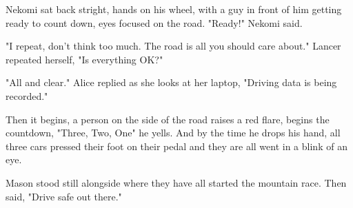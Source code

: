 Nekomi sat back stright, hands on his wheel, with a guy in front of him getting ready to count down, eyes focused on the road. "Ready!" Nekomi said.

"I repeat, don't think too much. The road is all you should care about." Lancer repeated herself, "Is everything OK?"

"All and clear." Alice replied as she looks at her laptop, "Driving data is being recorded."

Then it begins, a person on the side of the road raises a red flare, begins the countdown, "Three, Two, One" he yells. And by the time he drops his hand, all three cars pressed their foot on their pedal and they are all went in a blink of an eye.

Mason stood still alongside where they have all started the mountain race. Then said, "Drive safe out there."